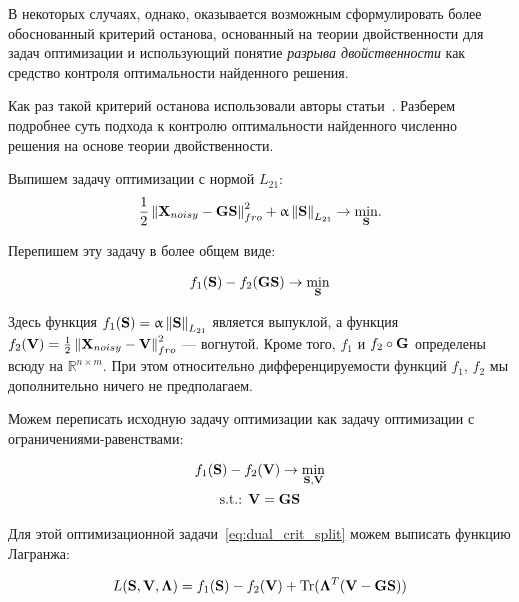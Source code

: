 В некоторых случаях, однако, оказывается возможным сформулировать более
обоснованный критерий останова, основанный на теории двойственности для
задач оптимизации и использующий понятие \emph{разрыва двойственности}
как средство контроля оптимальности найденного решения.

Как раз такой критерий останова использовали авторы статьи~\cite{Gramfort2012}.
Разберем подробнее суть подхода к контролю оптимальности найденного численно
решения на основе теории двойственности.

Выпишем задачу оптимизации с нормой $L_{21}$:
\begin{equation}
    \frac{1}{2}\left\lVert\mathbf{X}_{noisy} - \mathbf{G}\mathbf{S}\right\rVert^2_{fro} + \upalpha \left\lVert\mathbf{S}\right\rVert_{L_{21}}
    \rightarrow \underset{\mathbf{S}}{\min}.
    \label{eq:l21_reg_func_crit}
\end{equation}

Перепишем эту задачу в более общем виде:

\begin{equation}
    f_1(\mathbf{S}) - f_2(\mathbf{G}\mathbf{S}) \rightarrow \min_{\mathbf{S}}
    \label{eq:dual_init_crit}
\end{equation}

Здесь функция $f_1(\mathbf{S})=\upalpha \left\lVert\mathbf{S}\right\rVert_{L_{21}}$ является
выпуклой, а функция $f_2(\mathbf{V})=\frac{1}{2}\left\lVert\mathbf{X}_{noisy} - \mathbf{V}\right\rVert^2_{fro}$ --- вогнутой.
Кроме того, $f_1$ и $f_2\circ\mathbf{G}$ определены всюду на $\mathbb{R}^{n\times m}$.
При этом относительно дифференцируемости функций $f_1$, $f_2$ мы дополнительно
ничего не предполагаем.

Можем переписать исходную задачу оптимизации как задачу оптимизации с
ограничениями-равенствами:

\begin{equation}
    \begin{gathered}
        f_1(\mathbf{S}) - f_2(\mathbf{V}) \rightarrow \min_{\mathbf{S},\mathbf{V}}\\
        \text{s.t.: } \mathbf{V} = \mathbf{G}\mathbf{S}
    \end{gathered}
    \label{eq:dual_crit_split}
\end{equation}


Для этой оптимизационной задачи~\ref{eq:dual_crit_split} можем выписать функцию Лагранжа:

\begin{equation}
    L(\mathbf{S}, \mathbf{V}, \mathbf{\Lambda}) = f_1(\mathbf{S}) - f_2(\mathbf{V}) + \operatorname*{Tr}(\mathbf{\Lambda}^T(\mathbf{V} - \mathbf{G}\mathbf{S}))
    \label{eq:dual_lagrangian}
\end{equation}

